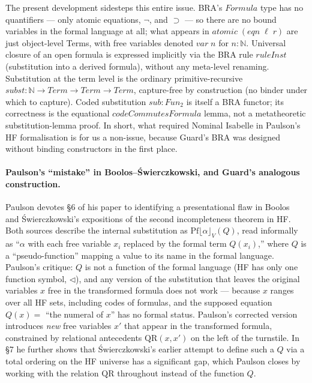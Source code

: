 \documentclass[11pt]{article}
\begin{document}
The present development sidesteps this entire issue.  BRA's
$\mathit{Formula}$ type has no quantifiers --- only atomic equations,
$\neg$, and $\supset$ --- so there are no bound variables in the
formal language at all; what appears in $\mathit{atomic}\;
(\mathit{eqn}\;\ell\;r)$ are just object-level Terms, with free
variables denoted $\mathit{var}\;n$ for $n : \mathbb N$.  Universal
closure of an open formula is expressed implicitly via the BRA rule
$\mathit{ruleInst}$ (substitution into a derived formula), without
any meta-level renaming.  Substitution at the term level is the
ordinary primitive-recursive $\mathit{subst} : \mathbb N \to
\mathit{Term} \to \mathit{Term} \to \mathit{Term}$, capture-free by
construction (no binder under which to capture).  Coded substitution
$\mathit{sub} : \mathit{Fun}_2$ is itself a BRA functor; its
correctness is the equational $\mathit{codeCommutesFormula}$ lemma,
not a metatheoretic substitution-lemma proof.  In short, what
required Nominal Isabelle in Paulson's HF formalisation is for us a
non-issue, because Guard's BRA was designed without binding
constructors in the first place.

\paragraph{Paulson's ``mistake'' in Boolos--\'{S}wierczkowski, and
Guard's analogous construction.}
Paulson devotes \S6 of his paper to identifying a presentational
flaw in Boolos~\cite{boolos1993} and \'{S}wierczkowski's expositions
of the second incompleteness theorem in HF.  Both sources describe
the internal substitution as $\mathrm{Pf}\lfloor\alpha\rfloor_V(Q)$,
read informally as ``$\alpha$ with each free variable $x_i$ replaced
by the formal term $Q(x_i)$,'' where $Q$ is a ``pseudo-function''
mapping a value to its name in the formal language.  Paulson's
critique: $Q$ is not a function of the formal language (HF has only
one function symbol, $\mathord{\lhd}$), and any version of the
substitution that leaves the original variables $x$ free in the
transformed formula does not work --- because $x$ ranges over all
HF sets, including codes of formulas, and the supposed equation
$Q(x) = $ ``the numeral of $x$'' has no formal status.  Paulson's
corrected version introduces \emph{new} free variables $x'$ that
appear in the transformed formula, constrained by relational
antecedents $\mathrm{QR}(x, x')$ on the left of the turnstile.  In
\S7 he further shows that \'{S}wierczkowski's earlier attempt to
define such a $Q$ via a total ordering on the HF universe has a
significant gap, which Paulson closes by working with the relation
$\mathrm{QR}$ throughout instead of the function $Q$.
\end{document}
